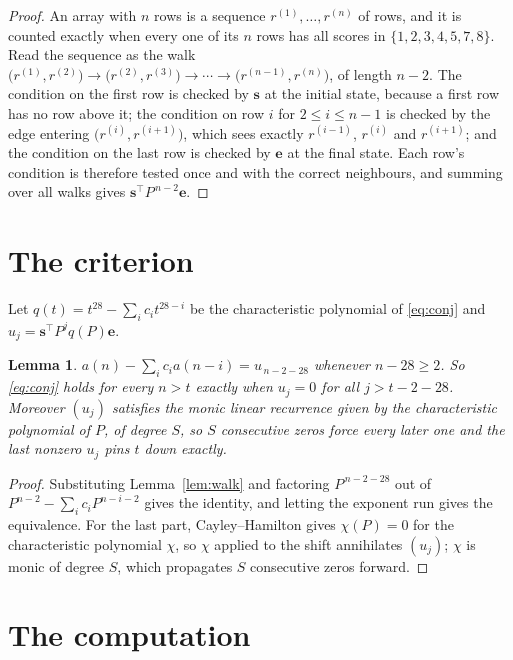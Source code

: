 \documentclass[11pt,a4paper]{article}
\theoremstyle{plain}
\newtheorem{lemma}[theorem]{Lemma}
\theoremstyle{definition}
\begin{document}
\begin{proof}
An array with $n$ rows is a sequence $r^{(1)},\dots,r^{(n)}$ of rows, and it is counted
exactly when every one of its $n$ rows has all scores in $\{1,2,3,4,5,7,8\}$. Read the sequence as the
walk $\bigl(r^{(1)},r^{(2)}\bigr)\to\bigl(r^{(2)},r^{(3)}\bigr)\to\cdots\to
\bigl(r^{(n-1)},r^{(n)}\bigr)$, of length $n-2$. The condition on the first row is
checked by $\mathbf{s}$ at the initial state, because a first row has no row above it; the
condition on row $i$ for $2\le i\le n-1$ is checked by the edge entering
$\bigl(r^{(i)},r^{(i+1)}\bigr)$, which sees exactly $r^{(i-1)}$, $r^{(i)}$ and
$r^{(i+1)}$; and the condition on the last row is checked by $\mathbf{e}$ at the final
state. Each row's condition is therefore tested once and with the correct neighbours, and
summing over all walks gives $\mathbf{s}^{\!\top}P^{\,n-2}\mathbf{e}$.
\end{proof}

\section{The criterion}

Let $q(t)=t^{28}-\sum_i c_i t^{28-i}$ be the characteristic polynomial of
\eqref{eq:conj} and $u_j=\mathbf{s}^{\!\top}P^{j}q(P)\mathbf{e}$.

\begin{lemma}\label{lem:crit}
$a(n)-\sum_i c_i a(n-i)=u_{\,n-2-28}$ whenever $n-28\ge2$. So \eqref{eq:conj}
holds for every $n>t$ exactly when $u_j=0$ for all $j>t-2-28$. Moreover $(u_j)$
satisfies the monic linear recurrence given by the characteristic polynomial of $P$, of
degree $S$, so $S$ consecutive zeros force every later one and the last nonzero $u_j$ pins
$t$ down exactly.
\end{lemma}

\begin{proof}
Substituting Lemma~\ref{lem:walk} and factoring $P^{\,n-2-28}$ out of
$P^{n-2}-\sum_i c_i P^{n-i-2}$ gives the identity, and letting the exponent run gives the
equivalence. For the last part, Cayley--Hamilton gives $\chi(P)=0$ for the characteristic
polynomial $\chi$, so $\chi$ applied to the shift annihilates $(u_j)$; $\chi$ is monic of
degree $S$, which propagates $S$ consecutive zeros forward.
\end{proof}

\section{The computation}
\end{document}
